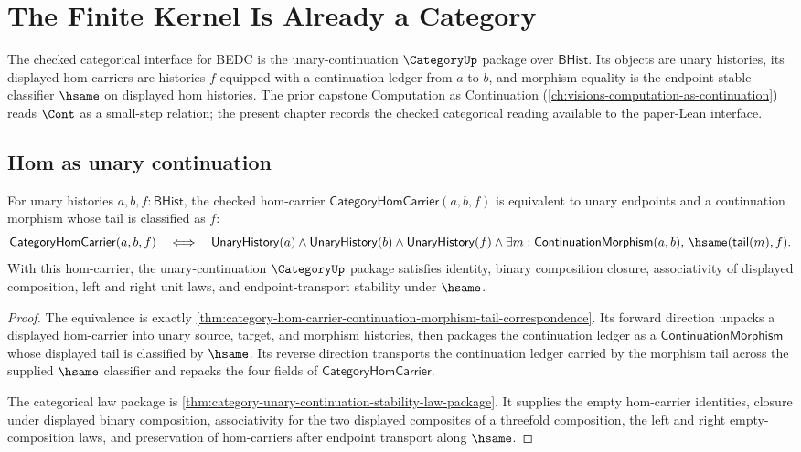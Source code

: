 \chapter{The Finite Kernel Is Already a Category}
\label{ch:visions-kernel-as-category}

The checked categorical interface for BEDC is the unary-continuation
$\CategoryUp$ package over $\mathsf{BHist}$. Its objects are unary histories,
its displayed hom-carriers are histories $f$ equipped with a continuation
ledger from $a$ to $b$, and morphism equality is the endpoint-stable
classifier $\hsame$ on displayed hom histories. The prior capstone
Computation as Continuation (\autoref{ch:visions-computation-as-continuation})
reads $\Cont$ as a small-step relation; the present chapter records the
checked categorical reading available to the paper-Lean interface.

\section{Hom as unary continuation}
\label{sec:kernel-as-category-hom-as-cont}

\begin{theorem}
\label{thm:kernel-as-category-unary-continuation-realization}
For unary histories $a,b,f:\mathsf{BHist}$, the checked hom-carrier
$\mathsf{CategoryHomCarrier}(a,b,f)$ is equivalent to unary endpoints and a
continuation morphism whose tail is classified as $f$:
$$
\mathsf{CategoryHomCarrier}(a,b,f)
\quad\Longleftrightarrow\quad
\mathsf{UnaryHistory}(a)\wedge
\mathsf{UnaryHistory}(b)\wedge
\mathsf{UnaryHistory}(f)\wedge
\exists m:\mathsf{ContinuationMorphism}(a,b),\,
\hsame(\mathsf{tail}(m),f).
$$
With this hom-carrier, the unary-continuation $\CategoryUp$ package satisfies
identity, binary composition closure, associativity of displayed composition,
left and right unit laws, and endpoint-transport stability under $\hsame$.
\end{theorem}

\begin{proof}
The equivalence is exactly
\autoref{thm:category-hom-carrier-continuation-morphism-tail-correspondence}.
Its forward direction unpacks a displayed hom-carrier into unary source,
target, and morphism histories, then packages the continuation ledger as a
$\mathsf{ContinuationMorphism}$ whose displayed tail is classified by
$\hsame$. Its reverse direction transports the continuation ledger carried by
the morphism tail across the supplied $\hsame$ classifier and repacks the four
fields of $\mathsf{CategoryHomCarrier}$.

The categorical law package is
\autoref{thm:category-unary-continuation-stability-law-package}. It supplies
the empty hom-carrier identities, closure under displayed binary composition,
associativity for the two displayed composites of a threefold composition,
the left and right empty-composition laws, and preservation of hom-carriers
after endpoint transport along $\hsame$.
\end{proof}


